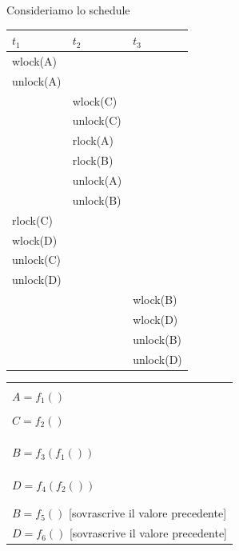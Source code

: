 Consideriamo lo schedule
\begin{multicols}{2}
\begin{flushright}
\begin{tabular}{|l|l|l|}
 \hline
 $t_1$ & $t_2$ & $t_3$\\
 \hline
 wlock(A)& &\\
 unlock(A)& &\\
 & wlock(C)& \\
 & unlock(C)& \\
 & rlock(A) & \\
 & rlock(B) &\\
  & unlock(A) &\\
  & unlock(B) &\\
 rlock(C) & &\\
 wlock(D) & &\\
 unlock(C)& & \\
 unlock(D)& & \\
 & & wlock(B)\\
 & & wlock(D)\\
 & & unlock(B)\\
 & & unlock(D)\\
\hline
 \end{tabular}
 \end{flushright}
 \begin{flushleft}
  \begin{tabular}{l}
   \\
   \\
   $A = f_1()$\\
   \\
   $C = f_2()$\\
   \\
   \\
   \\
   $B=f_3(f_1())$\\
   \\
   \\
   \\
   $D= f_4(f_2())$\\
   \\
   \\
   $B=f_5()$ [sovrascrive il valore precedente]\\
   $D=f_6()$ [sovrascrive il valore precedente]\\
  \end{tabular}

 \end{flushleft}

\end{multicols}


